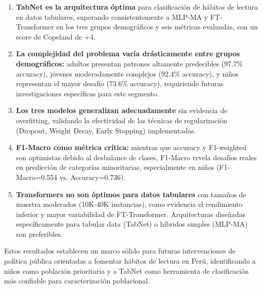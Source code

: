 \documentclass[12pt,a4paper]{article}
\begin{document}
\begin{enumerate}
    \item \textbf{TabNet es la arquitectura óptima} para clasificación de hábitos de lectura en datos tabulares, superando consistentemente a MLP-MA y FT-Transformer en los tres grupos demográficos y seis métricas evaluadas, con un score de Copeland de +4.
    
    \item \textbf{La complejidad del problema varía drásticamente entre grupos demográficos:} adultos presentan patrones altamente predecibles (97.7\% accuracy), jóvenes moderadamente complejos (92.4\% accuracy), y niños representan el mayor desafío (73.6\% accuracy), requiriendo futuras investigaciones específicas para este segmento.
    
    \item \textbf{Los tres modelos generalizan adecuadamente} sin evidencia de overfitting, validando la efectividad de las técnicas de regularización (Dropout, Weight Decay, Early Stopping) implementadas.
    
    \item \textbf{F1-Macro como métrica crítica:} mientras que accuracy y F1-weighted son optimistas debido al desbalance de clases, F1-Macro revela desafíos reales en predicción de categorías minoritarias, especialmente en niños (F1-Macro=0.554 vs. Accuracy=0.736).
    
    \item \textbf{Transformers no son óptimos para datos tabulares} con tamaños de muestra moderados (10K-40K instancias), como evidencia el rendimiento inferior y mayor variabilidad de FT-Transformer. Arquitecturas diseñadas específicamente para tabular data (TabNet) o híbridos simples (MLP-MA) son preferibles.
\end{enumerate}

Estos resultados establecen un marco sólido para futuras intervenciones de política pública orientadas a fomentar hábitos de lectura en Perú, identificando a niños como población prioritaria y a TabNet como herramienta de clasificación más confiable para caracterización poblacional.
\end{document}
